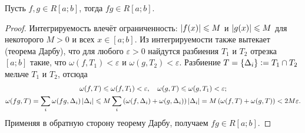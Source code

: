 \begin{theorem}
    Пусть $f, g \in R[a; b]$, тогда $fg \in R[a; b]$.
\end{theorem}

\begin{proof}
    Интегрируемость влечёт ограниченность: $\left\lvert f(x)\right\rvert \leqslant M$ и $\left\lvert g(x)\right\rvert \leqslant M$ для некоторого $M > 0$ и всех $x \in [a; b]$. Из интегрируемости также вытекает (теорема Дарбу), что для любого $\varepsilon > 0$ найдутся разбиения $T_1$ и $T_2$ отрезка $[a; b]$ такие, что $\omega(f, T_1) < \varepsilon$ и $\omega(g, T_2) < \varepsilon$. Разбиение $T = \{\Delta_i\} \vcentcolon = T_1 \cap T_2$ мельче $T_1$ и $T_2$, отсюда
    \begin{gather*}
        \omega(f, T) \leqslant \omega(f, T_1) < \varepsilon,\quad\omega(g, T) \leqslant \omega(g, T_1) < \varepsilon;\\
        \omega(fg, T) = \sum_i\omega(fg, \Delta_i)\left\lvert\Delta_i\right\rvert \leqslant M\sum_i\left(\omega(f, \Delta_i) + \omega(g, \Delta_i)\right)\left\lvert\Delta_i\right\rvert = M\left(\omega(f, T) + \omega(g, T)\right) < 2M\varepsilon.
    \end{gather*}
    Применяя в обратную сторону теорему Дарбу, получаем $fg \in R[a; b]$.
\end{proof}

